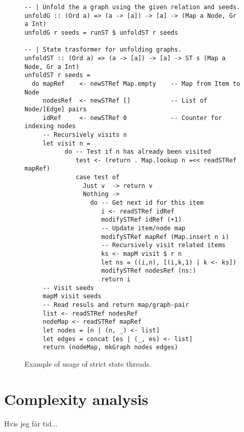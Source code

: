 \begin{figure}[ht]
\begin{cframed}{\textwidth}
\begin{lstlisting}[language=GHC]
-- | Unfold the a graph using the given relation and seeds.
unfoldG :: (Ord a) => (a -> [a]) -> [a] -> (Map a Node, Gr a Int)
unfoldG r seeds = runST $ unfoldST r seeds

-- | State trasformer for unfolding graphs.
unfoldST :: (Ord a) => (a -> [a]) -> [a] -> ST s (Map a Node, Gr a Int)
unfoldST r seeds =
  do mapRef    <- newSTRef Map.empty    -- Map from Item to Node
     nodesRef  <- newSTRef []           -- List of Node/[Edge] pairs
     idRef     <- newSTRef 0            -- Counter for indexing nodes
     -- Recursively visits n
     let visit n = 
           do -- Test if n has already been visited
              test <- (return . Map.lookup n =<< readSTRef mapRef)
              case test of
                Just v  -> return v
                Nothing -> 
                  do -- Get next id for this item
                     i <- readSTRef idRef
                     modifySTRef idRef (+1)
                     -- Update item/node map
                     modifySTRef mapRef (Map.insert n i)
                     -- Recursively visit related items
                     ks <- mapM visit $ r n 
                     let ns = ((i,n), [(i,k,1) | k <- ks])
                     modifySTRef nodesRef (ns:)
                     return i
     -- Visit seeds
     mapM visit seeds
     -- Read resuls and return map/graph-pair
     list <- readSTRef nodesRef         
     nodeMap <- readSTRef mapRef
     let nodes = [n | (n, _) <- list]
     let edges = concat [es | (_, es) <- list]
     return (nodeMap, mkGraph nodes edges)
\end{lstlisting}  
\end{cframed}
\caption{Example of usage of strict state threads.}
\label{fig:st}
\end{figure}
\clearpage

\section{Complexity analysis}
Hvis jeg får tid...
